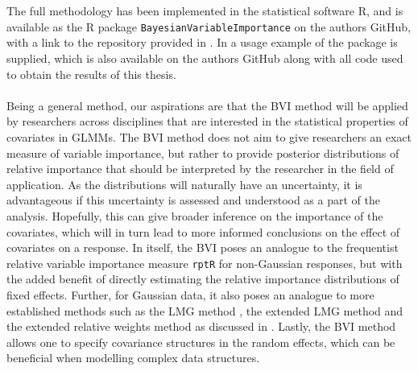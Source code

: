 \\
\\
The full methodology has been implemented in the statistical software R, and is available as the R package \texttt{BayesianVariableImportance} on the authors GitHub, with a link to the repository provided in . In  a usage example of the package is supplied, which is also available on the authors GitHub along with all code used to obtain the results of this thesis.
\\
\\
Being a general method, our aspirations are that the BVI method will be applied by researchers across disciplines that are interested in the statistical properties of covariates in GLMMs. The BVI method does not aim to give researchers an exact measure of variable importance, but rather to provide posterior distributions of relative importance that should be interpreted by the researcher in the field of application. As the distributions will naturally have an uncertainty, it is advantageous if this uncertainty is assessed and understood as a part of the analysis. Hopefully, this can give broader inference on the importance of the covariates, which will in turn lead to more informed conclusions on the effect of covariates on a response. In itself, the BVI poses an analogue to the frequentist relative variable importance measure \texttt{rptR} for non-Gaussian responses, but with the added benefit of directly estimating the relative importance distributions of fixed effects. Further, for Gaussian data, it also poses an analogue to more established methods such as the LMG method \citep{gromping_relaimpo}, the extended LMG method \citep{matre} and the extended relative weights method \citep{matre} as discussed in \citet{Arnstad:Relative_variable_importance_in_Bayesian_linear_mixed_models:2024}. Lastly, the BVI method allows one to specify covariance structures in the random effects, which can be beneficial when modelling complex data structures.
\\
\\

